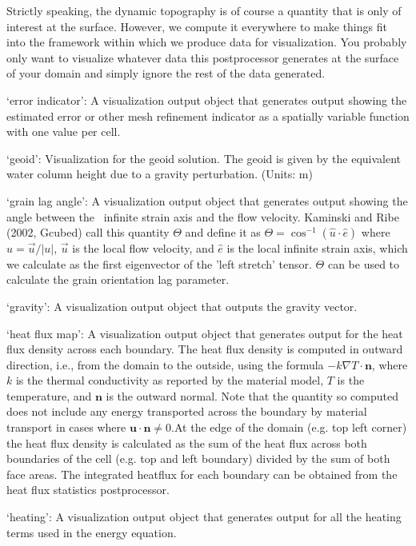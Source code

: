 \begin{itemize}
Strictly speaking, the dynamic topography is of course a quantity that is only of interest at the surface. However, we compute it everywhere to make things fit into the framework within which we produce data for visualization. You probably only want to visualize whatever data this postprocessor generates at the surface of your domain and simply ignore the rest of the data generated.

`error indicator': A visualization output object that generates output showing the estimated error or other mesh refinement indicator as a spatially variable function with one value per cell.

`geoid': Visualization for the geoid solution. The geoid is given by the equivalent water column height due to a gravity perturbation. (Units: m)

`grain lag angle': A visualization output object that generates output showing the angle between the ~infinite strain axis and the flow velocity. Kaminski and Ribe (2002, Gcubed) call this quantity $\Theta$ and define it as $\Theta = \cos^{-1}(\hat{u}\cdot\hat{e})$  where $\hat{u}=\vec{u}/|{u}|$, $\vec{u}$ is the local flow velocity, and $\hat{e}$ is the local infinite strain axis, which we calculate as the first eigenvector of the 'left stretch' tensor. $\Theta$ can be used to calculate the grain orientation lag parameter.

`gravity': A visualization output object that outputs the gravity vector.

`heat flux map': A visualization output object that generates output for the heat flux density across each boundary. The heat flux density is computed in outward direction, i.e., from the domain to the outside, using the formula $-k \nabla T \cdot \mathbf n$, where $k$ is the thermal conductivity as reported by the material model, $T$ is the temperature, and $\mathbf n$ is the outward normal. Note that the quantity so computed does not include any energy transported across the boundary by material transport in cases where $\mathbf u \cdot \mathbf n \neq 0$.At the edge of the domain (e.g. top left corner) the heat flux density is calculated as the sum of the heat flux across both boundaries of the cell (e.g. top and left boundary) divided by the sum of both face areas. The integrated heatflux for each boundary can be obtained from the heat flux statistics postprocessor.

`heating': A visualization output object that generates output for all the heating terms used in the energy equation.


\end{itemize}
